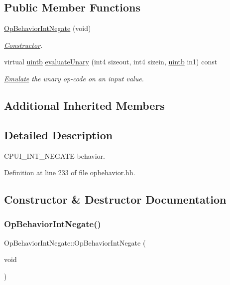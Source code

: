 \subsection*{Public Member Functions}
\begin{DoxyCompactItemize}
\item 
\mbox{\hyperlink{class_op_behavior_int_negate_a8a1366686297d9dd03c57078e24178e8}{Op\+Behavior\+Int\+Negate}} (void)
\begin{DoxyCompactList}\small\item\em \mbox{\hyperlink{class_constructor}{Constructor}}. \end{DoxyCompactList}\item 
virtual \mbox{\hyperlink{types_8h_a2db313c5d32a12b01d26ac9b3bca178f}{uintb}} \mbox{\hyperlink{class_op_behavior_int_negate_a055b850c85869cf54c6bf23699d8be5a}{evaluate\+Unary}} (int4 sizeout, int4 sizein, \mbox{\hyperlink{types_8h_a2db313c5d32a12b01d26ac9b3bca178f}{uintb}} in1) const
\begin{DoxyCompactList}\small\item\em \mbox{\hyperlink{class_emulate}{Emulate}} the unary op-\/code on an input value. \end{DoxyCompactList}\end{DoxyCompactItemize}
\subsection*{Additional Inherited Members}


\subsection{Detailed Description}
C\+P\+U\+I\+\_\+\+I\+N\+T\+\_\+\+N\+E\+G\+A\+TE behavior. 

Definition at line 233 of file opbehavior.\+hh.



\subsection{Constructor \& Destructor Documentation}
\mbox{\label{class_op_behavior_int_negate_a8a1366686297d9dd03c57078e24178e8}} 
\subsubsection{\texorpdfstring{OpBehaviorIntNegate()}{OpBehaviorIntNegate()}}
{\footnotesize\ttfamily Op\+Behavior\+Int\+Negate\+::\+Op\+Behavior\+Int\+Negate (\begin{DoxyParamCaption}\item[{void}]{ }\end{DoxyParamCaption})\hspace{0.3cm}{\ttfamily [inline]}}



